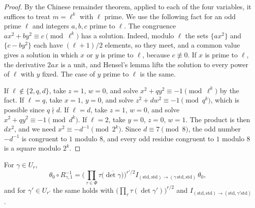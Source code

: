 \begin{proof}
By the Chinese remainder theorem, applied to each of the four variables, it suffices to treat $m=\ell^k$ with $\ell$ prime. We use the following fact for an odd prime $\ell$ and integers $a,b,c$ prime to $\ell$. The congruence $ax^2+by^2\equiv c\pmod{\ell^k}$ has a solution. Indeed, modulo $\ell$ the sets $\{ax^2\}$ and $\{c-by^2\}$ each have $(\ell+1)/2$ elements, so they meet, and a common value gives a solution in which $x$ or $y$ is prime to $\ell$, because $c\not\equiv0$. If $x$ is prime to $\ell$, the derivative $2ax$ is a unit, and Hensel's lemma lifts the solution to every power of $\ell$ with $y$ fixed. The case of $y$ prime to $\ell$ is the same.

If $\ell\notin\{2,q,d\}$, take $z=1$, $w=0$, and solve $x^2+qy^2\equiv-1\pmod{\ell^k}$ by the fact. If $\ell=q$, take $x=1$, $y=0$, and solve $z^2+dw^2\equiv-1\pmod{q^k}$, which is possible since $q\nmid d$. If $\ell=d$, take $z=1$, $w=0$, and solve $x^2+qy^2\equiv-1\pmod{d^k}$. If $\ell=2$, take $y=0$, $z=0$, $w=1$. The product is then $dx^2$, and we need $x^2\equiv-d^{-1}\pmod{2^k}$. Since $d\equiv7\pmod8$, the odd number $-d^{-1}$ is congruent to $1$ modulo $8$, and every odd residue congruent to $1$ modulo $8$ is a square modulo $2^k$.
\end{proof}

\begin{lemma}\label{weilconst}
For $\gamma\in U_r$,
\[
\theta_0\circ R_{\gamma,1}^{-1}=\Big(\prod_{\tau\in\Phi}\tau\big(\overline{\det\gamma}\big)\Big)^{r'/2}I_{(\mathrm{std},\mathrm{std})\to(\gamma\,\mathrm{std},\mathrm{std})}\,\theta_0 ,
\]
and for $\gamma'\in U_{r'}$ the same holds with $\big(\prod_\tau\tau(\det\gamma')\big)^{r/2}$ and $I_{(\mathrm{std},\mathrm{std})\to(\mathrm{std},\gamma'\mathrm{std})}$.
\end{lemma}

